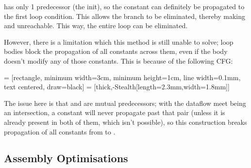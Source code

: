 \documentclass[12pt]{article}
\begin{document}
 has only 1 predecessor (the init), so the constant  can definitely be propagated to the first loop
condition. This allows the branch to be eliminated, thereby making  and  unreachable. This way,
the entire loop can be eliminated.

\pagebreak
However, there is a limitation which this method is still unable to solve; loop bodies block the propagation of all
constants across them, even if the body doesn't modify any of those constants. This is because of the following CFG:

\begin{center}
 = [rectangle, minimum width=3cm, minimum height=1cm, line width=0.1mm, text centered, draw=black]
 = [thick,-{Stealth[length=2.3mm,width=1.8mm]}]

\end{center}

The issue here is that  and  are mutual predecessors; with the dataflow meet being an intersection,
a constant will never propagate past that pair (unless it is already present in both of them, which isn't possible), so
this construction breaks propagation of all constants from  to .















\subsection{Assembly Optimisations}
\end{document}
